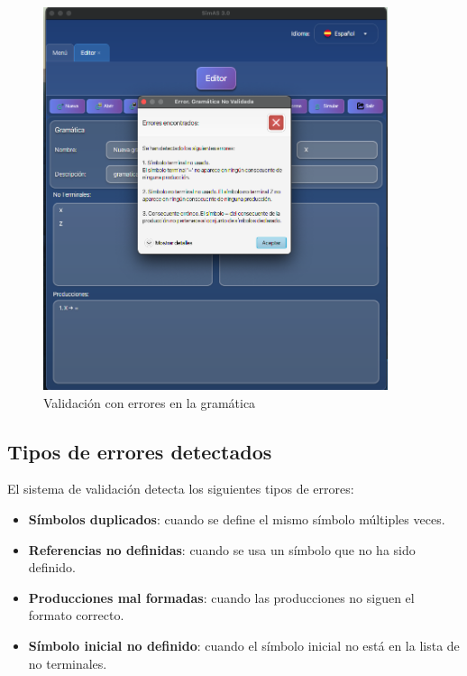\needspace{8cm}
\begin{figure}[H]
    \centering
    \includegraphics[width=0.9\textwidth]{figuras/editor/validar_incorrecta.png}
    \caption{Validación con errores en la gramática}
    \label{fig:validar_incorrecta}
\end{figure}

\subsection{Tipos de errores detectados}

El sistema de validación detecta los siguientes tipos de errores:

\begin{itemize}
    \item \textbf{Símbolos duplicados}: cuando se define el mismo símbolo múltiples veces.
    \item \textbf{Referencias no definidas}: cuando se usa un símbolo que no ha sido definido.
    \item \textbf{Producciones mal formadas}: cuando las producciones no siguen el formato correcto.
    \item \textbf{Símbolo inicial no definido}: cuando el símbolo inicial no está en la lista de no terminales.
\end{itemize}

